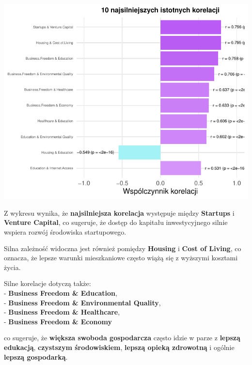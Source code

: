 \documentclass[
  12pt,
]{article}
\begin{document}
\begin{center}\includegraphics{Sprawozdanie2_files/figure-latex/znaczace_korelacje-1} \end{center}

Z wykresu wynika, że \textbf{najsilniejsza korelacja} występuje między
\textbf{Startups} i \textbf{Venture Capital}, co sugeruje, że dostęp do
kapitału inwestycyjnego silnie wspiera rozwój środowiska startupowego.

Silna zależność widoczna jest również pomiędzy \textbf{Housing} i
\textbf{Cost of Living}, co oznacza, że lepsze warunki mieszkaniowe
często wiążą się z wyższymi kosztami życia.

Silne korelacje dotyczą także:\\
- \textbf{Business Freedom \& Education},\\
- \textbf{Business Freedom \& Environmental Quality},\\
- \textbf{Business Freedom \& Healthcare},\\
- \textbf{Business Freedom \& Economy}

co sugeruje, że \textbf{większa swoboda gospodarcza} często idzie w
parze z \textbf{lepszą edukacją}, \textbf{czystszym środowiskiem},
\textbf{lepszą opieką zdrowotną} i ogólnie \textbf{lepszą gospodarką}.
\end{document}
